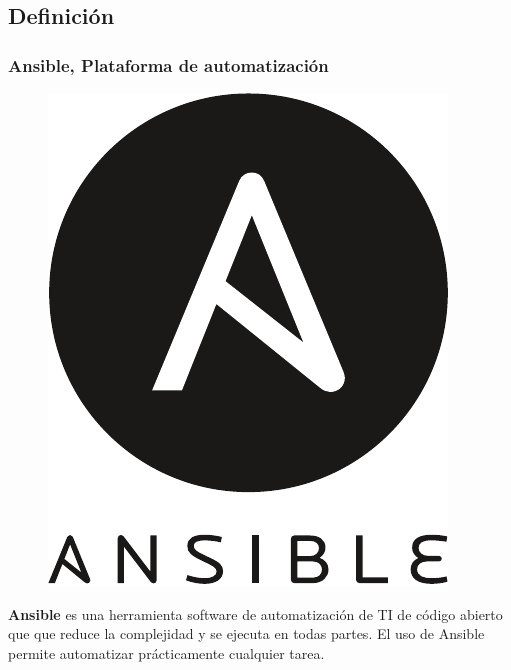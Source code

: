 \documentclass[
	11pt, %
]{beamer}
\begin{document}
\subsection{Definición}

\begin{frame}
	\frametitle{Ansible, Plataforma de automatización}

    \begin{figure}
        \centering
        \includegraphics[width=0.5\linewidth]{ansible_logo.pdf}
        \label{fig:ansible-logo}
    \end{figure}
    
    \textbf{Ansible} es una herramienta software de automatización de TI de código abierto que que reduce la complejidad y se ejecuta en todas partes. El uso de Ansible permite automatizar prácticamente cualquier tarea.

\end{frame}

\end{document}
